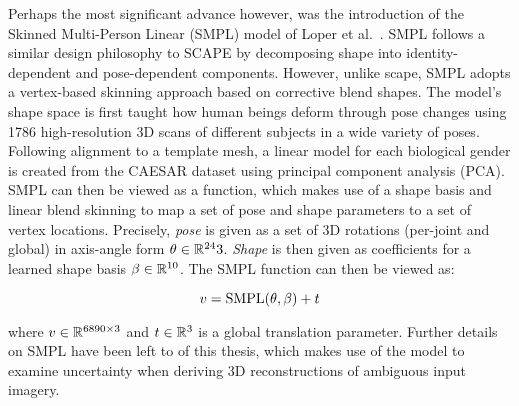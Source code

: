 Perhaps the most significant advance however, was the introduction of the Skinned Multi-Person Linear (SMPL) model of Loper et al.~\cite{loper15smpl}. SMPL follows a similar design philosophy to SCAPE by decomposing shape into identity-dependent and pose-dependent components. However, unlike scape, SMPL adopts a vertex-based skinning approach based on corrective blend shapes. The model's shape space is first taught how human beings deform through pose changes using 1786 high-resolution 3D scans of different subjects in a wide variety of poses. Following alignment to a template mesh, a linear model for each biological gender is created from the CAESAR dataset \cite{robinette2002civilian} using principal component analysis (PCA). SMPL can then be viewed as a function, which makes use of a shape basis and linear blend skinning to map a set of pose and shape parameters to a set of vertex locations. Precisely, \emph{pose} is given as a set of 3D rotations (per-joint and global) in axis-angle form $\theta \in {\mathbb{R}^{24}}{3}$. \emph{Shape} is then given as coefficients for a learned shape basis $\beta \in {\mathbb{R}^{10}}$. The SMPL function can then be viewed as:

\begin{equation}
    v = \operatorname{SMPL}(\theta, \beta) + t
\end{equation}

where $v \in {\mathbb{R}^{6890 \times 3}}$ and $t \in {\mathbb{R}^{3}}$ is a global translation parameter. Further details on SMPL have been left to  of this thesis, which makes use of the model to examine uncertainty when deriving 3D reconstructions of ambiguous input imagery.


